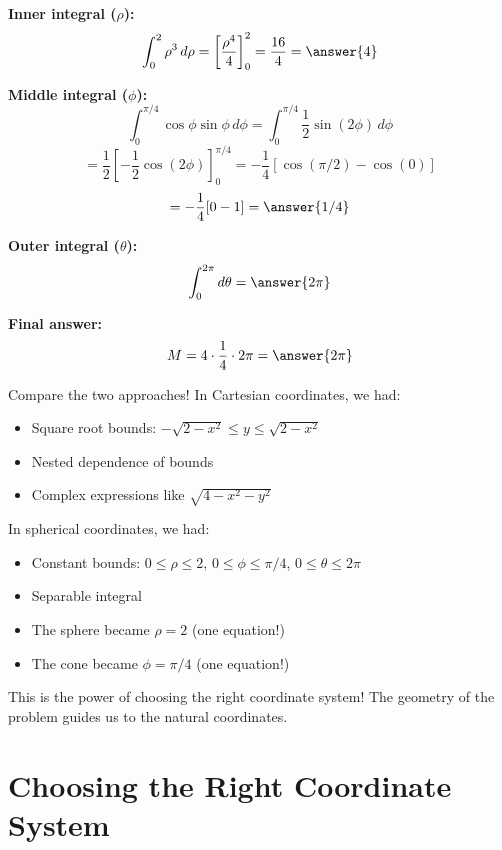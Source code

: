 \documentclass{ximera}
\begin{document}
\begin{problem}
\textbf{Inner integral ($\rho$):}
$$\int_0^2 \rho^3\,d\rho = \left[\frac{\rho^4}{4}\right]_0^2 = \frac{16}{4} = \answer{4}$$

\textbf{Middle integral ($\phi$):}
$$\int_0^{\pi/4} \cos\phi\sin\phi\,d\phi = \int_0^{\pi/4} \frac{1}{2}\sin(2\phi)\,d\phi$$
$$= \frac{1}{2}\left[-\frac{1}{2}\cos(2\phi)\right]_0^{\pi/4} = -\frac{1}{4}[\cos(\pi/2) - \cos(0)]$$
$$= -\frac{1}{4}[0 - 1] = \answer{1/4}$$

\textbf{Outer integral ($\theta$):}
$$\int_0^{2\pi} d\theta = \answer{2\pi}$$

\textbf{Final answer:}
$$M = 4 \cdot \frac{1}{4} \cdot 2\pi = \answer{2\pi}$$

\begin{feedback}
Compare the two approaches! In Cartesian coordinates, we had:
\begin{itemize}
    \item Square root bounds: $-\sqrt{2-x^2} \leq y \leq \sqrt{2-x^2}$
    \item Nested dependence of bounds
    \item Complex expressions like $\sqrt{4-x^2-y^2}$
\end{itemize}

In spherical coordinates, we had:
\begin{itemize}
    \item Constant bounds: $0 \leq \rho \leq 2$, $0 \leq \phi \leq \pi/4$, $0 \leq \theta \leq 2\pi$
    \item Separable integral
    \item The sphere became $\rho = 2$ (one equation!)
    \item The cone became $\phi = \pi/4$ (one equation!)
\end{itemize}

This is the power of choosing the right coordinate system! The geometry of the problem guides us to the natural coordinates.
\end{feedback}
\end{problem}


\section*{Choosing the Right Coordinate System}
\end{document}
